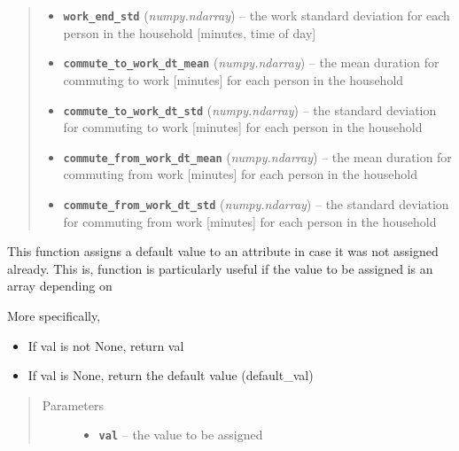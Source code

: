 \documentclass[letterpaper,10pt,english]{sphinxmanual}
\begin{document}
\begin{fulllineitems}
\begin{quote}
\begin{description}
\begin{itemize}
\item {} 
\textbf{\texttt{work\_end\_std}} (\emph{numpy.ndarray}) -- the work standard deviation for each person in the household     {[}minutes, time of day{]}

\item {} 
\textbf{\texttt{commute\_to\_work\_dt\_mean}} (\emph{numpy.ndarray}) -- the mean duration for commuting to work {[}minutes{]} for each person     in the household

\item {} 
\textbf{\texttt{commute\_to\_work\_dt\_std}} (\emph{numpy.ndarray}) -- the standard deviation for commuting to work {[}minutes{]} for     each person in the household

\item {} 
\textbf{\texttt{commute\_from\_work\_dt\_mean}} (\emph{numpy.ndarray}) -- the mean duration for commuting from work {[}minutes{]} for     each person in the household

\item {} 
\textbf{\texttt{commute\_from\_work\_dt\_std}} (\emph{numpy.ndarray}) -- the standard deviation for commuting from work {[}minutes{]} for each     person in the household

\end{itemize}

\end{description}\end{quote}

\begin{fulllineitems}
\label{params:params.Params.init_help}
This function assigns a default value to an attribute in case it was not assigned already. This is,         function is particularly useful if the value to be assigned is an array depending on 

More specifically,
\begin{itemize}
\item {} 
If val is not None, return val

\item {} 
If val is None, return the default value (default\_val)

\end{itemize}
\begin{quote}\begin{description}
\item[{Parameters}] \leavevmode\begin{itemize}
\item {} 
\textbf{\texttt{val}} -- the value to be assigned


\end{itemize}
\end{description}
\end{quote}
\end{fulllineitems}
\end{fulllineitems}
\end{document}
